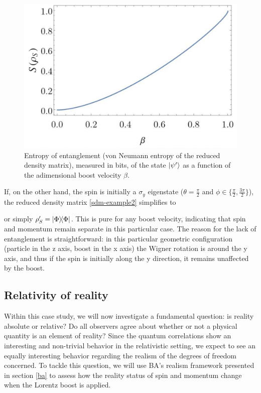 \documentclass[12pt,a4paper,notitlepage]{report}
\begin{document}
\begin{figure}[t]
  \centering
  \includegraphics[scale=.42]{../Figuras/entanglement-counter.eps}
  \captionsetup{font=footnotesize, margin=8pt}
  \caption{Entropy of entanglement (von Neumann entropy of the reduced density matrix), measured in bits, of the state $\ket{\psi'}$ as a function of the adimensional boost velocity $\beta$.}
  \label{entanglement-counter}
\end{figure}

If, on the other hand, the spin is initially a $\sigma_y$ eigenstate ($\theta=\frac{\pi}{2}$ and $\phi \in \{\frac{\pi}{2}, \frac{3\pi}{2}\}$), the reduced density matrix \eqref{sdm-example2} simplifies to

%
or simply $\rho'_S = \dyad{\Phi}$. This is pure for any boost velocity, indicating that spin and momentum remain separate in this particular case. The reason for the lack of entanglement is straightforward: in this particular geometric configuration (particle in the z axis, boost in the x axis) the Wigner rotation is around the y axis, and thus if the spin is initially along the y direction, it remains unaffected by the boost.

\subsection{Relativity of reality}

Within this case study, we will now investigate a fundamental question: is reality absolute or relative? Do all observers agree about whether or not a physical quantity is an element of reality? Since the quantum correlations show an interesting and non-trivial behavior in the relativistic setting, we expect to see an equally interesting behavior regarding the realism of the degrees of freedom concerned. To tackle this question, we will use BA's realism framework presented in section \ref{ba} to assess how the reality status of spin and momentum change when the Lorentz boost is applied.
\end{document}
